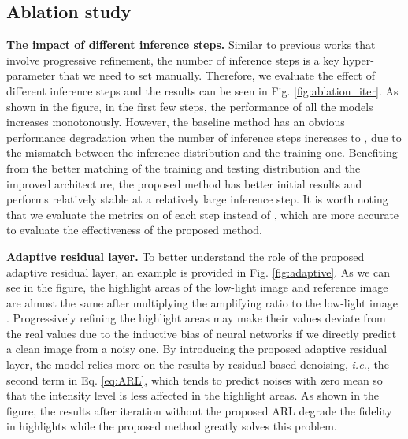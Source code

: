 \documentclass[10pt,twocolumn,letterpaper]{article}
\def\ie{\textit{i.e.}}
\newcommand{\para}[1]{\noindent\textbf{#1}}
\begin{document}
\subsection{Ablation study}
\vspace{-0.1cm}
\para{The impact of different inference steps.} Similar to previous works that involve progressive refinement, the number of inference steps is a key hyper-parameter that we need to set manually. Therefore, we evaluate the effect of different inference steps and the results can be seen in Fig. \ref{fig:ablation_iter}. As shown in the figure, in the first few steps, the performance of all the models increases monotonously. However, the baseline method has an obvious performance degradation when the number of inference steps increases to , due to the mismatch between the inference distribution and the training one. Benefiting from the better matching of the training and testing distribution and the improved architecture, the proposed method has better initial results and performs relatively stable at a relatively large inference step. It is worth noting that we evaluate the metrics on  of each step instead of , which are more accurate to evaluate the effectiveness of the proposed method.

\noindent\textbf{Adaptive residual layer.} To better understand the role of the proposed adaptive residual layer, an example is provided in Fig. \ref{fig:adaptive}. As we can see in the figure, the highlight areas of the low-light image and reference image are almost the same after multiplying the amplifying ratio to the low-light image \cite{huang2022towards}. Progressively refining the highlight areas may make their values deviate from the real values due to the inductive bias of neural networks if we directly predict a clean image from a noisy one. By introducing the proposed adaptive residual layer, the model relies more on the results by residual-based denoising, \ie, the second term in Eq. \ref{eq:ARL}, which tends to predict noises with zero mean so that the intensity level is less affected in the highlight areas. As shown in the figure, the results after iteration without the proposed ARL degrade the fidelity in highlights while the proposed method greatly solves this problem.

\vspace{-0.1cm}
\end{document}
